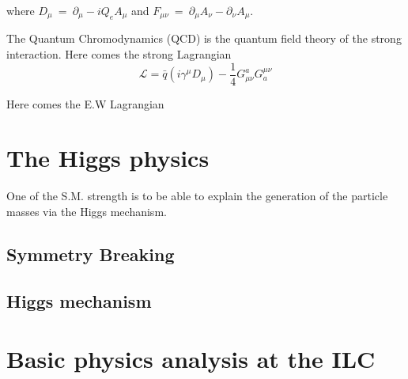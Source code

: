 	where $D_\mu \ = \ \partial_\mu - i Q_e A_\mu$ and $F_{\mu \nu} \ = \ \partial_\mu A_\nu - \partial_\nu A_\mu$.
    
    
    The Quantum Chromodynamics (QCD) is the quantum field theory of the strong interaction.
    Here comes the strong Lagrangian
    \begin{equation}
    	\mathcal{L} = \bar{q} \left(i \gamma^\mu D_\mu \right) - \frac{1}{4} G_{\mu \nu}^{a} G_{a}^{\mu \nu}
    \end{equation}
    
    
    Here comes the E.W Lagrangian
    

  \section{The Higgs physics}

	One of the S.M. strength is to be able to explain the generation of the particle masses via the Higgs mechanism.
    
    \subsection{Symmetry Breaking}

    \subsection{Higgs mechanism}

  \section{Basic physics analysis at the ILC}
